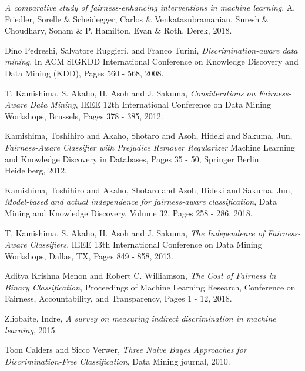\documentclass[a4paper, 12pt, notitlepage]{article}
\begin{document}
\vspace{0.6cm}

\begin{thebibliography}{10}

  
  \textit{A comparative study of fairness-enhancing interventions in machine learning},
  A. Friedler, Sorelle \& Scheidegger, Carlos \& Venkatasubramanian, Suresh \& Choudhary, Sonam \& P. Hamilton, Evan \& Roth, Derek,
  2018. 
  
  Dino Pedreshi, Salvatore Ruggieri, and Franco Turini,
  \textit{Discrimination-aware data mining},
  In ACM SIGKDD International Conference on Knowledge Discovery and Data Mining (KDD),
  Pages 560 - 568, 
  2008.

  T. Kamishima, S. Akaho, H. Asoh and J. Sakuma,
  \textit{Considerations on Fairness-Aware Data Mining},
  IEEE 12th International Conference on Data Mining Workshops, Brussels,
  Pages 378 - 385,
  2012.

  Kamishima, Toshihiro and Akaho, Shotaro and Asoh, Hideki and Sakuma, Jun,
  \textit{Fairness-Aware Classifier with Prejudice Remover Regularizer}
  Machine Learning and Knowledge Discovery in Databases,
  Pages 35 - 50,
  Springer Berlin Heidelberg,
  2012.

  Kamishima, Toshihiro and Akaho, Shotaro and Asoh, Hideki and Sakuma, Jun,
  \textit{Model-based and actual independence for fairness-aware classification},
  Data Mining and Knowledge Discovery,
  Volume 32,
  Pages 258 - 286,
  2018.

  T. Kamishima, S. Akaho, H. Asoh and J. Sakuma, 
  \textit{The Independence of Fairness-Aware Classifiers},
  IEEE 13th International Conference on Data Mining Workshops, Dallas, TX,
  Pages 849 - 858,
  2013.

  Aditya Krishna Menon and Robert C. Williamson,
  \textit{The Cost of Fairness in Binary Classification},
  Proceedings of Machine Learning Research,
  Conference on Fairness, Accountability, and Transparency,
  Pages 1 - 12,
  2018.

  Zliobaite, Indre,
  \textit{A survey on measuring indirect discrimination in machine learning},
  2015. 


  Toon Calders and Sicco Verwer,
  \textit{Three Naive Bayes Approaches for Discrimination-Free Classification},
  Data Mining journal,
  2010. 

\end{thebibliography}
\end{document}

